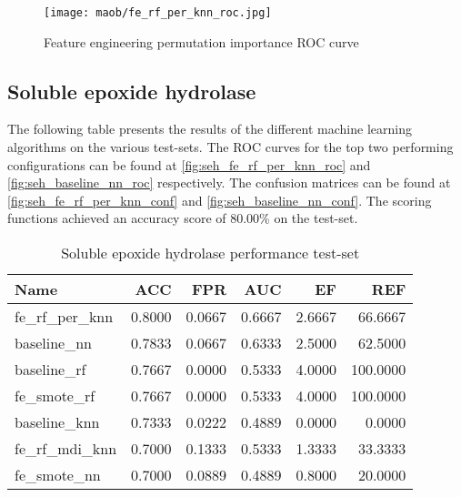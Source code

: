 \begin{figure}[H]
    \begin{center}
        \caption[]{Feature engineering permutation importance ROC curve}
        \label{fig:maob_fe_rf_per_knn_roc}
        \texttt{[image: maob/fe\_rf\_per\_knn\_roc.jpg]}
    \end{center}
\end{figure}

\subsection{Soluble epoxide hydrolase}
The following table presents the results of the different machine learning algorithms on the various
test-sets. The ROC curves for the top two performing configurations can be found at \ref{fig:seh_fe_rf_per_knn_roc} and \ref{fig:seh_baseline_nn_roc}
respectively. The confusion matrices can be found at \ref{fig:seh_fe_rf_per_knn_conf} and \ref{fig:seh_baseline_nn_conf}.
The scoring functions achieved an accuracy score of 80.00\% on the test-set.

\begin{table}[H]
    \begin{center}
        \caption{Soluble epoxide hydrolase performance test-set}
        \begin{tabular}{lrrrrr}
            \toprule
            Name             & ACC    & FPR    & AUC    & EF     & REF      \\
            \midrule
            fe\_rf\_per\_knn & 0.8000 & 0.0667 & 0.6667 & 2.6667 & 66.6667  \\
            baseline\_nn     & 0.7833 & 0.0667 & 0.6333 & 2.5000 & 62.5000  \\
            baseline\_rf     & 0.7667 & 0.0000 & 0.5333 & 4.0000 & 100.0000 \\
            fe\_smote\_rf    & 0.7667 & 0.0000 & 0.5333 & 4.0000 & 100.0000 \\
            baseline\_knn    & 0.7333 & 0.0222 & 0.4889 & 0.0000 & 0.0000   \\
            fe\_rf\_mdi\_knn & 0.7000 & 0.1333 & 0.5333 & 1.3333 & 33.3333  \\
            fe\_smote\_nn    & 0.7000 & 0.0889 & 0.4889 & 0.8000 & 20.0000  \\
            \bottomrule
        \end{tabular}
    \end{center}
\end{table}


